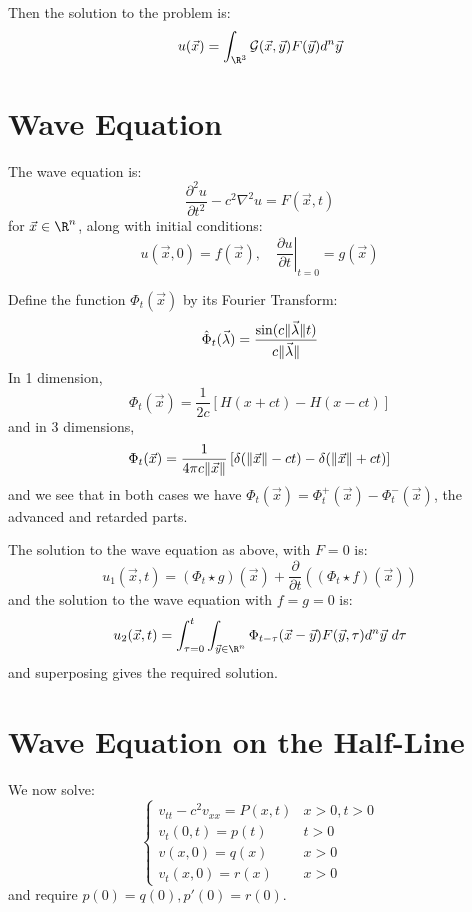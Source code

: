 \documentclass[../Main.tex]{subfiles}
\begin{document}
Then the solution to the problem is:
\begin{equation*}
    u(\vec{x}) = \int_{\R^3} \DGrn(\vec{x}, \vec{y}) F(\vec{y}) d^n\vec{y}
\end{equation*}
\section{Wave Equation}
The wave equation is:
\begin{equation*}
    \frac{\partial^{2}u}{\partial t^{2}} - c^2 \nabla^2 u = F(\vec{x}, t)
\end{equation*}
for $\vec{x} \in \R^n$, along with initial conditions:
\begin{equation*}
    u(\vec{x}, 0) = f(\vec{x}),\quad \left.\frac{\partial u}{\partial t}\right|_{t = 0} = g(\vec{x})
\end{equation*}

Define the function $\Phi_t(\vec{x})$ by its Fourier Transform:
\begin{equation*}
    \hat{\Phi}_t(\vec{\lambda}) = \frac{\sin(c\lVert\vec{\lambda}\rVert t)}{c\lVert\vec{\lambda}\rVert}
\end{equation*}
In 1 dimension,
\begin{equation*}
    \Phi_t(\vec{x}) = \frac{1}{2c} \left[H(x+ct)-H(x-ct)\right]
\end{equation*}
and in 3 dimensions,
\begin{equation*}
    \Phi_t(\vec{x}) = \frac{1}{4\pi c \lVert\vec{x}\rVert} \left[\delta(\lVert\vec{x}\rVert - ct) - \delta(\lVert\vec{x}\rVert + ct)\right]
\end{equation*}
and we see that in both cases we have $\Phi_t(\vec{x}) = \Phi_t^+(\vec{x}) - \Phi_t^-(\vec{x})$, the advanced and retarded parts.

The solution to the wave equation as above, with $F = 0$ is:
\begin{equation*}
    u_1(\vec{x}, t) = (\Phi_t \star g)(\vec{x}) + \frac{\partial}{\partial t} ((\Phi_t \star f)(\vec{x}))
\end{equation*}
and the solution to the wave equation with $f = g = 0$ is:
\begin{equation*}
    u_2(\vec{x}, t) = \int_{\tau = 0}^t \int_{\vec{y} \in \R^n} \Phi_{t - \tau} (\vec{x} - \vec{y}) F(\vec{y}, \tau) d^n\vec{y}~d\tau
\end{equation*}
and superposing gives the required solution.
\section{Wave Equation on the Half-Line}
We now solve:
\begin{equation*}
    \begin{cases}
        v_{tt} - c^2 v_{xx} = P(x, t)  & x > 0, t > 0 \\
        v_t(0, t) = p(t) & t > 0 \\
        v(x, 0) = q(x) & x > 0 \\
        v_t(x, 0) = r(x) & x > 0
    \end{cases}
\end{equation*}
and require $p(0) = q(0), p'(0) = r(0)$.
\end{document}
